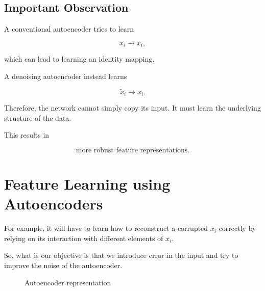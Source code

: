 \documentclass{article}
\begin{document}
\subsection{Important Observation}

A conventional autoencoder tries to learn

\[
x_i\rightarrow x_i,
\]

which can lead to learning an identity mapping.

A denoising autoencoder instead learns

\[
\boxed{
	\widetilde{x}_i\rightarrow x_i.
}
\]

Therefore, the network cannot simply copy its input. It must learn the
underlying structure of the data.

This results in

\[
\boxed{
	\text{more robust feature representations}.
}
\]



\section{Feature Learning using Autoencoders}

For example, it will have to learn how to reconstruct a corrupted
\(x_i\) correctly by relying on its interaction with different
elements of \(x_i\).

So, what is our objective is that we introduce error in the input and
try to improve the noise of the autoencoder.

\begin{figure}[H]
	\centering
	\caption{Autoencoder representation}
\end{figure}
\end{document}
